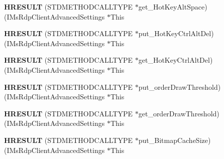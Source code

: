 \begin{DoxyCompactItemize}
\mbox{\label{struct_i_ms_rdp_client_advanced_settings_vtbl_a38f9ff7954c82c431137c867f31f27c8}} 
{\bfseries H\+R\+E\+S\+U\+LT} (S\+T\+D\+M\+E\+T\+H\+O\+D\+C\+A\+L\+L\+T\+Y\+PE $\ast$get\+\_\+\+Hot\+Key\+Alt\+Space)(I\+Ms\+Rdp\+Client\+Advanced\+Settings $\ast$This
\item 
\mbox{\label{struct_i_ms_rdp_client_advanced_settings_vtbl_a2e2b2f6ced20393f0a0db5019e826413}} 
{\bfseries H\+R\+E\+S\+U\+LT} (S\+T\+D\+M\+E\+T\+H\+O\+D\+C\+A\+L\+L\+T\+Y\+PE $\ast$put\+\_\+\+Hot\+Key\+Ctrl\+Alt\+Del)(I\+Ms\+Rdp\+Client\+Advanced\+Settings $\ast$This
\item 
\mbox{\label{struct_i_ms_rdp_client_advanced_settings_vtbl_a0457f6e4cb45f994035da6d0faadb924}} 
{\bfseries H\+R\+E\+S\+U\+LT} (S\+T\+D\+M\+E\+T\+H\+O\+D\+C\+A\+L\+L\+T\+Y\+PE $\ast$get\+\_\+\+Hot\+Key\+Ctrl\+Alt\+Del)(I\+Ms\+Rdp\+Client\+Advanced\+Settings $\ast$This
\item 
\mbox{\label{struct_i_ms_rdp_client_advanced_settings_vtbl_ae1077f3a9dc18a3b89a615530a6fd623}} 
{\bfseries H\+R\+E\+S\+U\+LT} (S\+T\+D\+M\+E\+T\+H\+O\+D\+C\+A\+L\+L\+T\+Y\+PE $\ast$put\+\_\+order\+Draw\+Threshold)(I\+Ms\+Rdp\+Client\+Advanced\+Settings $\ast$This
\item 
\mbox{\label{struct_i_ms_rdp_client_advanced_settings_vtbl_a30ec9be6de3fc21b1aae0d604b9bdb37}} 
{\bfseries H\+R\+E\+S\+U\+LT} (S\+T\+D\+M\+E\+T\+H\+O\+D\+C\+A\+L\+L\+T\+Y\+PE $\ast$get\+\_\+order\+Draw\+Threshold)(I\+Ms\+Rdp\+Client\+Advanced\+Settings $\ast$This
\item 
\mbox{\label{struct_i_ms_rdp_client_advanced_settings_vtbl_a25ac5c7275a97ee257743b6185cb9828}} 
{\bfseries H\+R\+E\+S\+U\+LT} (S\+T\+D\+M\+E\+T\+H\+O\+D\+C\+A\+L\+L\+T\+Y\+PE $\ast$put\+\_\+\+Bitmap\+Cache\+Size)(I\+Ms\+Rdp\+Client\+Advanced\+Settings $\ast$This
\item 
\mbox{\label{struct_i_ms_rdp_client_advanced_settings_vtbl_a463cad4ffc789a5bdff7b87ffcf7c030}} 

\end{DoxyCompactItemize}
